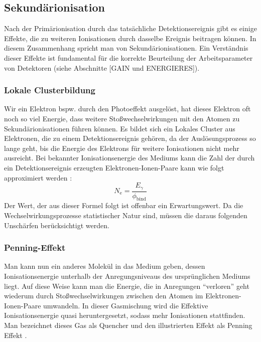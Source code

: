 		
	\newpage
	
	\subsection{Sekundärionisation}	
		Nach der Primärionisation durch das tatsächliche Detektionsereignis gibt es einige Effekte, die zu weiteren Ionisationen durch dasselbe Ereignis beitragen können. In diesem Zusammenhang spricht man von Sekundärionisationen. Ein Verständnis dieser Effekte ist fundamental für die korrekte Beurteilung der Arbeitsparameter von Detektoren (siehe Abschnitte [GAIN und ENERGIERES]).
		
		\subsubsection{Lokale Clusterbildung}
			Wir ein Elektron bspw. durch den Photoeffekt ausgelöst, hat dieses Elektron oft noch so viel Energie, dass weitere Stoßwechselwirkungen mit den Atomen zu Sekundärionisationen führen können. Es bildet sich ein Lokales Cluster aus Elektronen, die zu einem Detektionsereignis gehören, da der Auslösungsprozess so lange geht, bis die Energie des Elektrons für weitere Ionisationen nicht mehr ausreicht. Bei bekannter Ionisationsenergie des Mediums kann die Zahl der durch ein Detektionsereignis erzeugten Elektronen-Ionen-Paare kann wie folgt approximiert werden \cite{Sauli_Multiwire}:
			\begin{equation*}
				N_{\text{e}}=\frac{E_{\gamma}}{\phi_{\text{bind}}}
			\end{equation*}	
			Der Wert, der aus dieser Formel folgt ist offenbar ein Erwartungswert. Da die Wechselwirkungsprozesse statistischer Natur sind, müssen die daraus folgenden Unschärfen berücksichtigt werden.
		
		\subsubsection{Penning-Effekt}
			Man kann nun ein anderes Molekül in das Medium geben, dessen Ionisationsenergie unterhalb der Anregungsniveaus des ursprünglichen Mediums liegt. Auf diese Weise kann man die Energie, die in Anregungen \enquote{verloren} geht wiederum durch Stoßwechselwirkungen zwischen den Atomen im Elektronen-Ionen-Paare umwandeln. In dieser Gasmischung wird die Effektive Ionisationsenergie quasi heruntergesetzt, sodass mehr Ionisationen stattfinden. Man bezeichnet dieses Gas als Quencher und den illustrierten Effekt als Penning Effekt \cite{ottnad}.
			
